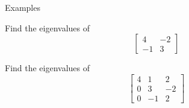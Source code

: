 \documentclass{beamer}
\begin{document}
\begin{frame}{Examples}
\begin{example}
	Find the eigenvalues of
	\begin{equation*}
		\left[
		\begin{matrix}
		4&-2\\
		-1&3
		\end{matrix}
		\right]
	\end{equation*}
\end{example}
\begin{example}
	Find the eigenvalues of
	\begin{equation*}
		\left[
		\begin{matrix}
		4&1&2\\
		0&3&-2\\
		0&-1&2
		\end{matrix}
		\right]
	\end{equation*}
\end{example}
\end{frame}
\end{document}
